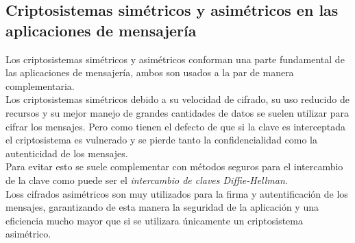 \subsection{Criptosistemas simétricos y asimétricos en las aplicaciones de mensajería}
Los criptosistemas simétricos y asimétricos conforman una parte fundamental de las aplicaciones de mensajería, ambos son usados a la par de manera complementaria.\\
Los criptosistemas simétricos debido a su velocidad de cifrado, su uso reducido de recursos y su mejor manejo de grandes cantidades de datos se suelen utilizar para cifrar los mensajes. 
Pero como tienen el defecto de que si la clave es interceptada el criptosistema es vulnerado y se pierde tanto la confidencialidad como la autenticidad de los mensajes.\\ 
Para evitar esto se suele complementar con métodos seguros para el intercambio de la clave como puede ser el \emph{intercambio de claves Diffie-Hellman}.\\
Loss cifrados asimétricos son muy utilizados para la firma y autentificación de los mensajes, garantizando de esta manera la seguridad de la aplicación y una eficiencia mucho mayor que si se utilizara únicamente un criptosistema asimétrico.\\


